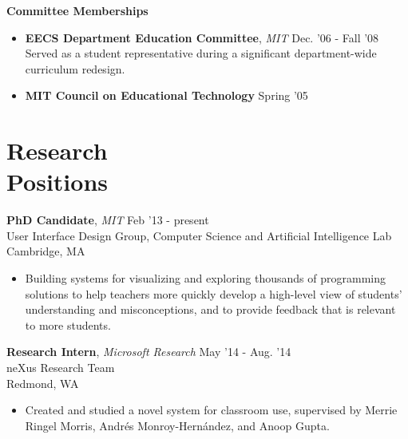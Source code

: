 \documentclass[margin]{res}
\begin{document}
\begin{resume}
		 {\bf  Committee Memberships}  
                 \begin{itemize}[leftmargin=*] %
\item {\bf EECS Department Education Committee}, {\it MIT} \hfill Dec. '06 - Fall '08 \\
Served as a student representative during a significant department-wide curriculum redesign.
\item {\bf MIT Council on Educational Technology} \hfill Spring '05 
 \end{itemize}
		 


          

		
		 

\section{Research \\Positions}

 {\bf PhD Candidate}, {\it MIT} \hfill Feb '13 - present \\ User Interface Design Group, Computer Science and Artificial Intelligence Lab \\ Cambridge, MA 
 \begin{itemize} \itemsep -2pt  %
 \item Building systems for visualizing and exploring thousands of programming solutions to help teachers more quickly develop a high-level view of students' understanding and misconceptions, and to provide feedback that is relevant to more students.
 \end{itemize}

{\bf Research Intern}, {\it Microsoft Research} \hfill May '14 - Aug. '14 \\ neXus Research Team \\ Redmond, WA 
 \begin{itemize} \itemsep -2pt  %
 \item Created and studied a novel system for classroom use, supervised by Merrie Ringel Morris, Andrés Monroy-Hernández, and Anoop Gupta. 
\end{itemize}


\end{resume}
\end{document}
